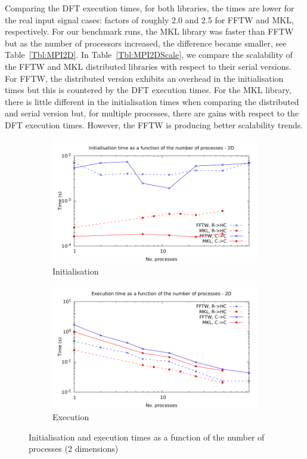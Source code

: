 \documentclass[12pt, a4paper]{article} \setlength{\textheight}{24cm}
\begin{document}
Comparing the DFT execution times, for both libraries, the times are
lower for the real input signal cases: factors of roughly 2.0 and 2.5
for FFTW and MKL, respectively. For our benchmark runs, the MKL
library was faster than FFTW but as the number of processors
increased, the difference became smaller, see
Table~\ref{Tbl:MPI2D}. In Table~\ref{Tbl:MPI2DScale}, we compare the
scalability of the FFTW and MKL distributed libraries with respect to
their serial versions. For FFTW, the distributed version exhibits an
overhead in the initialisation times but this is countered by the DFT
execution times. For the MKL library, there is little different in the
initialisation times when comparing the distributed and serial version
but, for multiple processes, there are gains with respect to the DFT
execution times. However, the FFTW is producing better scalability
trends.




\begin{figure}[H]
  \centering
  \begin{subfigure}{.5\textwidth}
    \centering
    \includegraphics[width=.9\linewidth]{graphs/mpi-init-2d.pdf}
    \caption{Initialisation}
    \label{2DMPII}
  \end{subfigure}%
  \begin{subfigure}{.5\textwidth}
    \centering
    \includegraphics[width=.9\linewidth]{graphs/mpi-exec-2d.pdf}
    \caption{Execution}
    \label{2DMPIE}
  \end{subfigure}
  \caption{Initialisation and execution times as a function of the
    number of processes (2 dimensions)}
  \label{2DMPI}
\end{figure}
\end{document}
